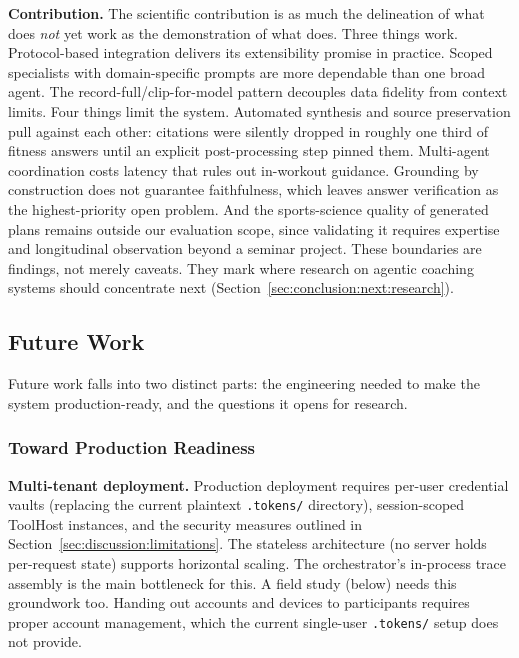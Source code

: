 \textbf{Contribution.} The scientific contribution is as much the delineation of what does \textit{not} yet work as the demonstration of what does. Three things work. Protocol-based integration delivers its extensibility promise in practice. Scoped specialists with domain-specific prompts are more dependable than one broad agent. The record-full/clip-for-model pattern decouples data fidelity from context limits. Four things limit the system. Automated synthesis and source preservation pull against each other: citations were silently dropped in roughly one third of fitness answers until an explicit post-processing step pinned them. Multi-agent coordination costs latency that rules out in-workout guidance. Grounding by construction does not guarantee faithfulness, which leaves answer verification as the highest-priority open problem. And the sports-science quality of generated plans remains outside our evaluation scope, since validating it requires expertise and longitudinal observation beyond a seminar project. These boundaries are findings, not merely caveats. They mark where research on agentic coaching systems should concentrate next (Section~\ref{sec:conclusion:next:research}).

\subsection{Future Work}\label{sec:conclusion:next}

Future work falls into two distinct parts: the engineering needed to make the system production-ready, and the questions it opens for research.

\subsubsection{Toward Production Readiness}\label{sec:conclusion:next:production}

\textbf{Multi-tenant deployment.} Production deployment requires per-user credential vaults (replacing the current plaintext \texttt{.tokens/} directory), session-scoped ToolHost instances, and the security measures outlined in Section~\ref{sec:discussion:limitations}. The stateless architecture (no server holds per-request state) supports horizontal scaling. The orchestrator's in-process trace assembly is the main bottleneck for this. A field study (below) needs this groundwork too. Handing out accounts and devices to participants requires proper account management, which the current single-user \texttt{.tokens/} setup does not provide.


